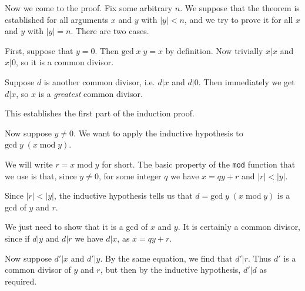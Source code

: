 \begin{slide*}


\vspace*{0.5cm}

Now we come to the proof. Fix some arbitrary {\red $n$}. We suppose that
the theorem is established for all arguments {\red $x$} and {\red
$y$} with {\red $|y| < n$}, and we try to prove it for all {\red
$x$} and {\red $y$} with {\red $|y| = n$}. There are
two cases.

First, suppose that {\red $y = 0$}. Then {\red $\mbox{gcd}\; x\; y
= x$} by definition. Now trivially {\red $x | x$} and {\red $x |
0$}, so it is a common divisor.

Suppose {\red $d$} is another common divisor, i.e. {\red $d | x$}
and {\red $d | 0$}. Then immediately we get {\red $d | x$}, so
$x$ is a {\em greatest} common divisor.

This establishes the first part of the induction proof.

\end{slide*}





\begin{slide*}


\vspace*{0.5cm}

Now suppose {\red $y \not= 0$}. We want to apply the inductive hypothesis to
{\red $\mbox{gcd}\; y\; (x\; \mbox{mod}\; y)$}.

We will write {\red $r = x\; \mbox{mod}\; y$} for short. The basic property of
the {\tt mod} function that we use is that, since {\red $y \not= 0$}, for some
integer {\red $q$} we have {\red $x = q y + r$} and {\red $|r| < |y|$}.

Since {\red $|r| < |y|$}, the inductive hypothesis tells us that {\red $d =
\mbox{gcd}\; y\; (x\; \mbox{mod}\; y)$} is a gcd of {\red $y$} and {\red $r$}.

We just need to show that it is a gcd of {\red $x$} and {\red $y$}. It is
certainly a common divisor, since if {\red $d | y$} and {\red $d | r$} we have
{\red $d | x$}, as {\red $x = q y + r$}.

Now suppose {\red $d' | x$} and {\red $d' | y$}. By the same equation, we find
that {\red $d' | r$}. Thus {\red $d'$} is a common divisor of {\red $y$} and
{\red $r$}, but then by the inductive hypothesis, {\red $d' | d$} as required.

\end{slide*}






